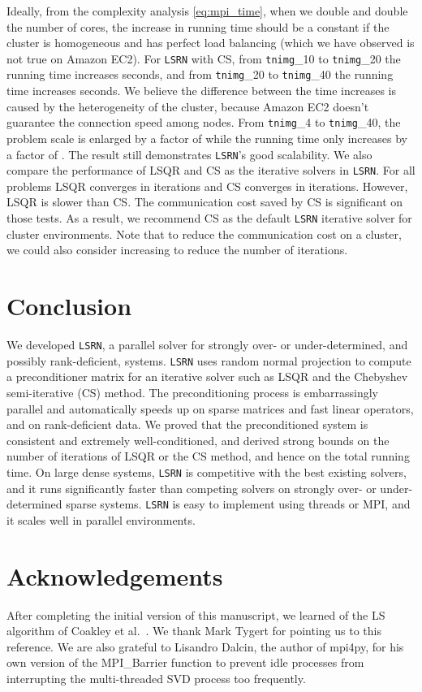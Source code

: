 \documentclass{siamltex}
\begin{document}
Ideally, from the complexity analysis \eqref{eq:mpi_time}, when we double 
and double the number of cores, the increase in running time should be a
constant if the cluster is homogeneous and has perfect load balancing (which we
have observed is not true on Amazon EC2).  For \texttt{LSRN} with CS, from
\texttt{tnimg}\_10 to \texttt{tnimg}\_20 the running time increases 
seconds, and from \texttt{tnimg}\_20 to \texttt{tnimg}\_40 the running time
increases  seconds.  We believe the difference between the time increases
is caused by the heterogeneity of the cluster, because Amazon EC2 doesn't
guarantee the connection speed among nodes.  From \texttt{tnimg}\_4 to
\texttt{tnimg}\_40, the problem scale is enlarged by a factor of  while the
running time only increases by a factor of . The result still demonstrates
\texttt{LSRN}'s good scalability. We also compare the performance of LSQR and CS
as the iterative solvers in \texttt{LSRN}. For all problems LSQR converges in
 iterations and CS converges in  iterations. However, LSQR is slower
than CS. The communication cost saved by CS is significant on those tests. As a
result, we recommend CS as the default \texttt{LSRN} iterative solver for
cluster environments. Note that to reduce the communication cost on a cluster,
we could also consider increasing  to reduce the number of iterations.


\section{Conclusion}
\label{sec:conclusion}

We developed \texttt{LSRN}, a parallel solver for strongly over- or
under-determined, and possibly rank-deficient, systems.  \texttt{LSRN} uses
random normal projection to compute a preconditioner matrix for an iterative
solver such as LSQR and the Chebyshev semi-iterative (CS) method. The
preconditioning process is embarrassingly parallel and automatically speeds up
on sparse matrices and fast linear operators, and on rank-deficient data.  We
proved that the preconditioned system is consistent and extremely
well-conditioned, and derived strong bounds on the number of iterations of LSQR
or the CS method, and hence on the total running time. On large dense systems,
\texttt{LSRN} is competitive with the best existing solvers, and it runs
significantly faster than competing solvers on strongly over- or
under-determined sparse systems. \texttt{LSRN} is easy to implement using
threads or MPI, and it scales well in parallel environments.


\section*{Acknowledgements}

After completing the initial version of this manuscript, we learned of
the LS algorithm of Coakley et al.\ \cite{coakley2011fast}.
We thank Mark Tygert for pointing us to this reference.  We are also
grateful to Lisandro Dalcin, the author of mpi4py, for his own version
of the MPI\_Barrier function to prevent idle processes from
interrupting the multi-threaded SVD process too frequently.

\newpage



\end{document}
